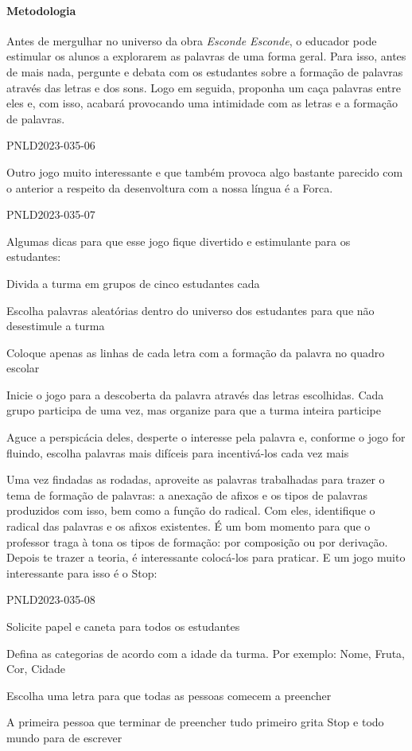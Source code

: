 \documentclass[11pt]{extarticle}
\begin{document}
\paragraph{Metodologia} Antes de mergulhar no universo da obra \textit{Esconde Esconde}, o educador pode estimular os alunos a explorarem as palavras de uma forma geral. Para isso, antes de mais nada, pergunte e debata com os estudantes sobre a formação de palavras através das letras e dos sons. Logo em seguida, proponha um caça palavras entre eles e, com isso, acabará provocando uma intimidade com as letras e a formação de palavras. 

PNLD2023-035-06

Outro jogo muito interessante e que também provoca algo bastante parecido com o anterior a respeito da desenvoltura com a nossa língua é a Forca. 

PNLD2023-035-07

Algumas dicas para que esse jogo fique divertido e estimulante para os estudantes: 

\item Divida a turma em grupos de cinco estudantes cada
\item Escolha palavras aleatórias dentro do universo dos estudantes para que não desestimule a turma
\item Coloque apenas as linhas de cada letra com a formação da palavra no quadro escolar
\item Inicie o jogo para a descoberta da palavra através das letras escolhidas. Cada grupo participa de uma vez, mas organize para que a turma inteira participe
\item Aguce a perspicácia deles, desperte o interesse pela palavra e, conforme o jogo for fluindo, escolha palavras mais difíceis para incentivá-los cada vez mais

Uma vez findadas as rodadas, aproveite as palavras trabalhadas para trazer o tema de formação de palavras: a anexação de afixos e os tipos de palavras produzidos com isso, bem como a função do radical. Com eles, identifique o radical das palavras e os afixos existentes. É um bom momento para que o professor traga à tona os tipos de formação: por composição ou por derivação. Depois te trazer a teoria, é interessante colocá-los para praticar. E um jogo muito interessante para isso é o Stop:

PNLD2023-035-08

\item Solicite papel e caneta para todos os estudantes
\item Defina as categorias de acordo com a idade da turma. Por exemplo: Nome, Fruta, Cor, Cidade
\item Escolha uma letra para que todas as pessoas comecem a preencher
\item A primeira pessoa que terminar de preencher tudo primeiro grita Stop e todo mundo para de escrever
\end{document}
